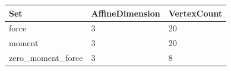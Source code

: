 \begin{tabular}{@{}lll@{}}
\toprule
Set & AffineDimension & VertexCount \\
\midrule
force & 3 & 20 \\
moment & 3 & 20 \\
zero\_moment\_force & 3 & 8 \\
\bottomrule
\end{tabular}
